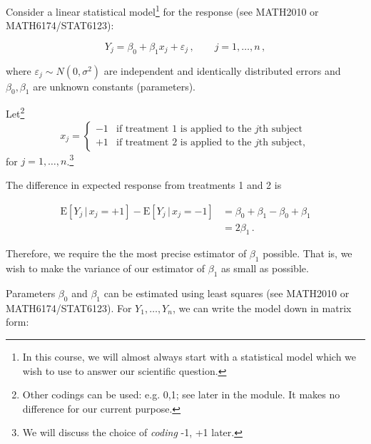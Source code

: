 \documentclass[
]{book}
\theoremstyle{definition}
\theoremstyle{definition}
\theoremstyle{definition}
\theoremstyle{definition}
\theoremstyle{remark}
\begin{document}
Consider a linear statistical model\footnote{In this course, we will almost always start with a statistical model which we wish to use to answer our scientific question.} for the response (see MATH2010 or MATH6174/STAT6123):

\begin{equation}
Y_j=\beta_{0}+\beta_{1}x_j+\varepsilon_j\,,\qquad j=1, \ldots, n\,,
\label{eq:slr}
\end{equation}

where \(\varepsilon_j\sim N(0,\sigma^{2})\) are independent and identically distributed errors and \(\beta_{0}, \beta_{1}\) are unknown constants (parameters).

Let\footnote{Other codings can be used: e.g. 0,1; see later in the module. It makes no difference for our current purpose.}
\begin{equation}
x_{j}=\left\{\begin{array}{ll}
-1&\textrm{if treatment 1 is applied to the $j$th subject}\\
+1&\textrm{if treatment 2 is applied to the $j$th subject}\nonumber ,
\end{array}
\right.
\end{equation}
for \(j=1,\dots,n\).\footnote{We will discuss the choice of \emph{coding} -1, +1 later.}

The difference in expected response from treatments 1 and 2 is

\begin{equation}
\begin{split}
\textrm{E}[Y_j\, |\, x_j = +1] - \textrm{E}[Y_j\, |\, x_j = -1] & = \beta_{0}+\beta_{1}-\beta_{0}+\beta_{1} \\
& = 2\beta_{1}\,.
\end{split}
\label{eq:ex-ex-response}
\end{equation}

Therefore, we require the the most precise estimator of \(\beta_{1}\) possible. That is, we wish to make the variance of our estimator of \(\beta_1\) as small as possible.

Parameters \(\beta_{0}\) and \(\beta_{1}\) can be estimated using least squares (see MATH2010 or MATH6174/STAT6123). For \(Y_1,\dots,Y_n\), we can write the model down in matrix form:
\end{document}
